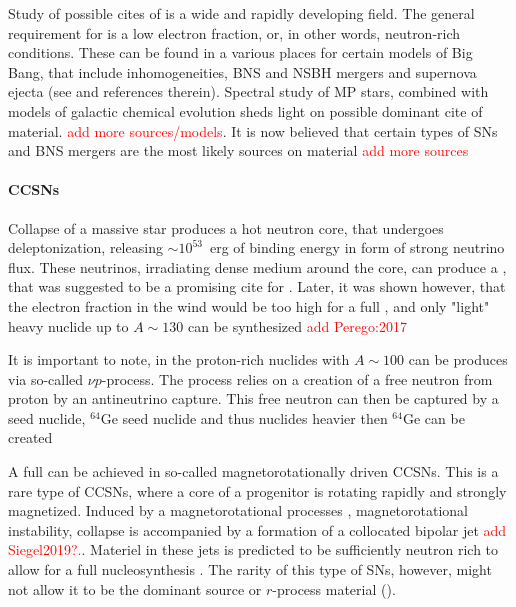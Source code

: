Study of possible cites of \rproc{} is a wide and rapidly developing field. 
The general requirement for \rproc{} is a low electron fraction, or, in other words, neutron-rich conditions. These can be found in a various places for certain models of Big Bang, that include inhomogeneities, \ac{BNS} and \ac{NSBH} mergers and supernova ejecta (see \cite{Mathews:1990} and references therein). Spectral study of \ac{MP} stars, combined with models of galactic chemical evolution sheds light on possible dominant cite of \rproc{} material. \textcolor{red}{add more sources/models}. It is now believed that certain types of \acp{SN} and \ac{BNS} mergers are the most likely sources on \rproc{} material \citep{Mathews:1990,Thielemann:2011} \textcolor{red}{add more sources}


\paragraph{\acp{CCSN}}

Collapse of a massive star produces a hot neutron core, that undergoes deleptonization, releasing $\sim10^{53}$~erg of binding energy in form of strong neutrino flux. These neutrinos, irradiating dense medium around the core, can produce a \nwind{} \citep{Qian:1996xt}, that was suggested to be a promising cite for \rproc{} \citep{Woosley:2002,Wanajo:2006mq}. Later, it was shown however, that the electron fraction in the wind would be too high for a full \rproc{}, and only "light" heavy nuclide up to $A\sim130$ can be synthesized \citep{Qian:1996xt,Thompson:2001ys,Fischer:2010,Roberts:2010,MartinezPinedo:2012rb,Wanajo:2013} \textcolor{red}{add Perego:2017} 

It is important to note, in the proton-rich \nwind{} nuclides with $A\sim 100$ can be produces via so-called $\nu p$-process. The process relies on a creation of a free neutron from proton by an antineutrino capture. This free neutron can then be captured by a seed nuclide, $^{64}$Ge seed nuclide and thus nuclides heavier then $^{64}$Ge can be created \citep{Frohlich:2006,Pruet:2005qd,Wanajo:2010mc,Arcones:2012}

A full \rproc{} can be achieved in so-called magnetorotationally driven \acp{CCSN}. This is a rare type of \acp{CCSN}, where a core of a progenitor is rotating rapidly and strongly magnetized. Induced by a magnetorotational processes \eg, magnetorotational instability, collapse is accompanied by a formation of a collocated bipolar jet \citep{Wheeler:2000,Akiyama:2003,Burrows:2007yx,Mosta:2014jaa,Mosta:2015} \textcolor{red}{add Siegel2019?.}. Materiel in these jets is predicted to be sufficiently neutron rich to allow for a full \rproc{} nucleosynthesis \citep{Winteler:2012,Nishimura:2015nca}. The rarity of this type of \acp{SN}, however, might not allow it to be the dominant source or $r$-process material \cite{Nishimura:2015nca} (). 


